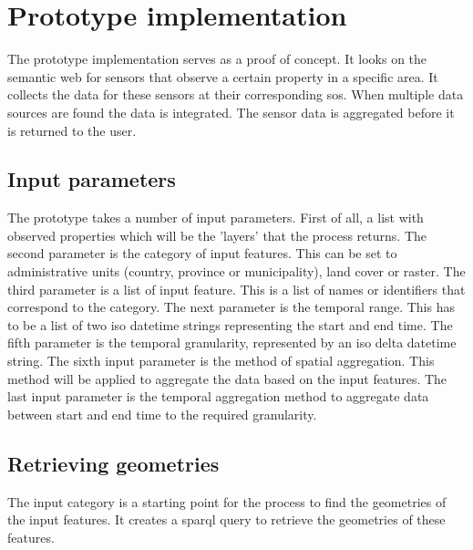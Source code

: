 

\section{Prototype implementation}
The prototype implementation serves as a proof of concept. It looks on the semantic web for sensors that observe a certain property in a specific area. It collects the data for these sensors at their corresponding \acl{sos}. When multiple data sources are found the data is integrated. The sensor data is aggregated before it is returned to the user.

\subsection{Input parameters}
The prototype takes a number of input parameters. First of all, a list with observed properties which will be the 'layers' that the process returns. The second parameter is the category of input features. This can be set to administrative units (country, province or municipality), land cover or raster. The third parameter is a list of input feature. This is a list of names or identifiers that correspond to the category. The next parameter is the temporal range. This has to be a list of two \ac{iso} datetime strings representing the start and end time. The fifth parameter is the temporal granularity, represented by an \ac{iso} delta datetime string. The sixth input parameter is the method of spatial aggregation. This method will be applied to aggregate the data based on the input features. The last input parameter is the temporal aggregation method to aggregate data between start and end time to the required granularity.      

\subsection{Retrieving geometries}
The input category is a starting point for the process to find the geometries of the input features. It creates a \ac{sparql} query to retrieve the geometries of these features. 

